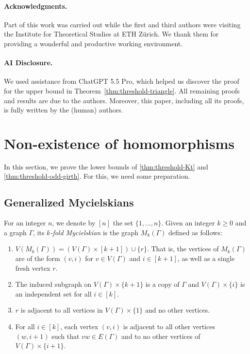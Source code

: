 \documentclass{article}
\begin{document}
\paragraph*{Acknowledgments.} Part of this work was carried out while the first and third authors were visiting the Institute for Theoretical Studies at ETH Z\"urich. We thank them for providing a wonderful and productive working environment. 

\paragraph*{AI Disclosure.} We used assistance from ChatGPT 5.5 Pro, which helped us discover 
the proof for the upper bound in Theorem~\ref{thm:threshold-triangle}. All remaining proofs and results are due to the authors. Moreover, this paper, including all its proofs, is fully written by the (human) authors.

\section{Non-existence of homomorphisms}

In this section, we prove the lower bounds of \cref{thm:threshold-Kt} and \cref{thm:threshold-odd-girth}.
For this, we need some preparation.

\subsection{Generalized Mycielskians}

For an integer $n$, we denote by $[n]$ the set $\{1, \ldots, n\}$.
Given an integer $k \geq 0$ and a graph $\Gamma$, its \emph{$k$-fold Mycielskian} is the graph $M_k(\Gamma)$ defined as follows: \begin{enumerate}
    \item $V(M_k(\Gamma)) = (V(\Gamma) \times [k+1]) \cup \{r\}$. That is, the vertices of $M_k(\Gamma)$ are of the form $(v, i)$ for $v \in V(\Gamma)$ and $i \in [k+1]$, as well as a single fresh vertex $r$.
    \item The induced subgraph on $V(\Gamma) \times \{k+1\}$ is a copy of $\Gamma$ and $V(\Gamma) \times \{i\}$ is an independent set for all $i \in [k]$.
    \item $r$ is adjacent to all vertices in $V(\Gamma) \times \{1\}$ and no other vertices.
    \item For all $i \in [k]$, each vertex $(v, i)$ is adjacent to all other vertices $(w, i+1)$ such that $vw \in E(\Gamma)$ and to no other vertices of $V(\Gamma) \times \{i+1\}$.
\end{enumerate}
\end{document}

